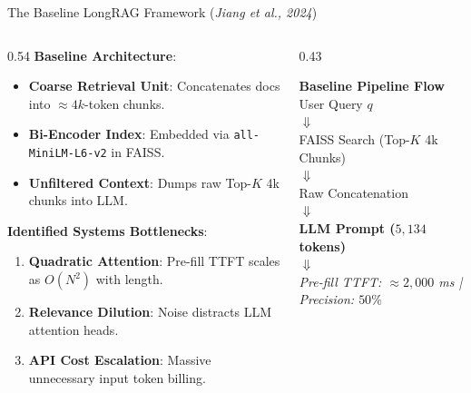 \documentclass[10pt,aspectratio=169]{beamer}
\begin{document}
\begin{frame}{The Baseline LongRAG Framework (\textit{Jiang et al., 2024})}
    \begin{columns}[onlytextwidth,T]
        \begin{column}{0.54\textwidth}
            \textbf{Baseline Architecture}:
            \begin{itemize}\setlength\itemsep{2pt}
                \item \textbf{Coarse Retrieval Unit}: Concatenates docs into $\approx 4k$-token chunks.
                \item \textbf{Bi-Encoder Index}: Embedded via \texttt{all-MiniLM-L6-v2} in FAISS.
                \item \textbf{Unfiltered Context}: Dumps raw Top-$K$ 4k chunks into LLM.
            \end{itemize}
            
            \vspace{0.15cm}
            \textbf{Identified Systems Bottlenecks}:
            \begin{enumerate}\setlength\itemsep{2pt}
                \item \textbf{Quadratic Attention}: Pre-fill TTFT scales as $O(N^2)$ with length.
                \item \textbf{Relevance Dilution}: Noise distracts LLM attention heads.
                \item \textbf{API Cost Escalation}: Massive unnecessary input token billing.
            \end{enumerate}
        \end{column}
        
        \begin{column}{0.43\textwidth}
            \begin{exampleblock}{\textbf{Baseline Pipeline Flow}}
                \centering
                \footnotesize
                User Query $q$ \\
                $\Downarrow$ \\
                FAISS Search (Top-$K$ 4k Chunks) \\
                $\Downarrow$ \\
                Raw Concatenation \\
                $\Downarrow$ \\
                \textbf{LLM Prompt ($5,134$ tokens)} \\
                $\Downarrow$ \\
                \textit{Pre-fill TTFT: $\approx 2,000$ ms | Precision: $50\%$}
            \end{exampleblock}
        \end{column}
    \end{columns}
\end{frame}
\end{document}
